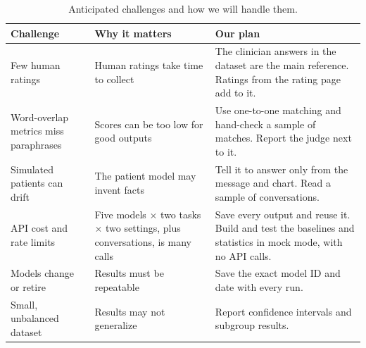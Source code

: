 \documentclass[11pt]{article}
\begin{document}
\begin{table}[t]
\centering\small
\begin{tabularx}{\textwidth}{@{}L{3.6cm}L{4.6cm}Y@{}}
\toprule
\textbf{Challenge} & \textbf{Why it matters} & \textbf{Our plan} \\
\midrule
Few human ratings & Human ratings take time to collect & The clinician answers in the dataset are the main reference. Ratings from the rating page add to it. \\
Word-overlap metrics miss paraphrases & Scores can be too low for good outputs & Use one-to-one matching and hand-check a sample of matches. Report the judge next to it. \\
Simulated patients can drift & The patient model may invent facts & Tell it to answer only from the message and chart. Read a sample of conversations. \\
API cost and rate limits & Five models $\times$ two tasks $\times$ two settings, plus conversations, is many calls & Save every output and reuse it. Build and test the baselines and statistics in mock mode, with no API calls. \\
Models change or retire & Results must be repeatable & Save the exact model ID and date with every run. \\
Small, unbalanced dataset & Results may not generalize & Report confidence intervals and subgroup results. \\
\bottomrule
\end{tabularx}
\caption{Anticipated challenges and how we will handle them.}
\label{tab:challenges}
\end{table}
\end{document}
